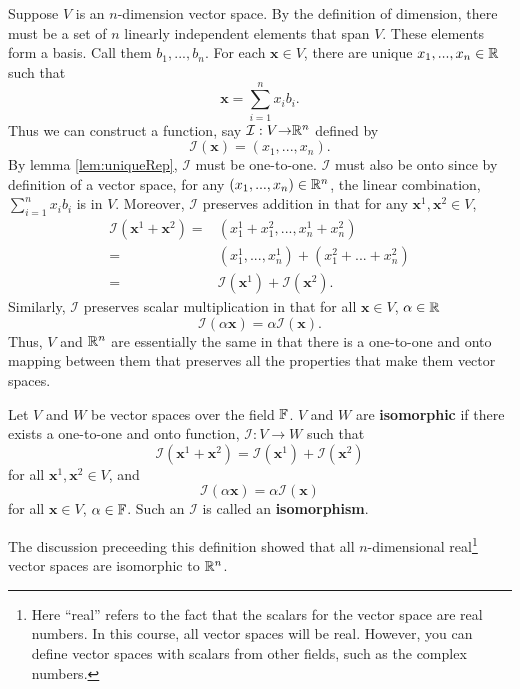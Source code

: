 Suppose $V$ is an $n$-dimension vector space. By the definition of dimension,
there must be a set of $n$ linearly independent elements that span
$V$. These elements form a basis. Call them $b_1, ..., b_n$. For each
$\mathbf{x} \in V$, there are unique $x_1, ..., x_n \in \mathbb{R}$ such that 
\[ \mathbf{x} = \sum_{i=1}^n x_i b_i. \]
Thus we can construct a function, say $\mathcal{I}: V {\rightarrow} \mathbb{R}^n$ defined by 
\[ \mathcal{I}(\mathbf{x}) = (x_1, ..., x_n). \]
By lemma \ref{lem:uniqueRep}, $\mathcal{I}$ must be one-to-one. $\mathcal{I}$ must also be
onto since by definition of a vector space, for any $(x_1, ..., x_n)
\in \mathbb{R}^n$, the linear combination, $\sum_{i=1}^n x_i b_i$ is in
$V$. Moreover, $\mathcal{I}$ preserves addition in that for
any $\mathbf{x}^1, \mathbf{x}^2 \in V$,
\begin{align*}
  \mathcal{I}(\mathbf{x}^1 + \mathbf{x}^2) = & (x_1^1 + x_1^2, ..., x_n^1 + x_n^2) \\
  = & (x_1^1, ..., x_n^1) + (x_1^2 + ... + x_n^2) \\
  = & \mathcal{I}(\mathbf{x}^1) + \mathcal{I}(\mathbf{x}^2).
\end{align*}
Similarly, $\mathcal{I}$ preserves scalar multiplication in that for all $\mathbf{x} \in
V$, $\alpha \in \mathbb{R}$
\[ \mathcal{I}(\alpha \mathbf{x}) = \alpha \mathcal{I}(\mathbf{x}). \]
Thus, $V$ and $\mathbb{R}^n$ are essentially the same in that there is a
one-to-one and onto mapping between them that preserves all the
properties that make them vector spaces. 
\begin{definition}
  Let $V$ and $W$ be vector spaces over the field $\mathbb{F}$. $V$ and $W$ are
  \textbf{isomorphic} if there exists a one-to-one and onto function,
  $\mathcal{I}:V \to W$ such that 
  \[ \mathcal{I}(\mathbf{x}^1 + \mathbf{x}^2) =
  \mathcal{I}(\mathbf{x}^1) + \mathcal{I}(\mathbf{x}^2) \] for all
  $\mathbf{x}^1, \mathbf{x}^2 \in V$, and
  \[ \mathcal{I}(\alpha \mathbf{x}) = \alpha \mathcal{I}(\mathbf{x}) \]
  for all $\mathbf{x} \in V$, $\alpha \in \mathbb{F}$.
  Such an $\mathcal{I}$ is called an \textbf{isomorphism}.
\end{definition}
The discussion preceeding this definition showed that all
$n$-dimensional real\footnote{Here ``real'' refers to the fact that
  the scalars for the vector space are real numbers. In this course,
  all vector spaces will be real. However, you can define vector
  spaces with scalars from other fields, such as the complex numbers.}
vector spaces are isomorphic to $\mathbb{R}^n$. 


